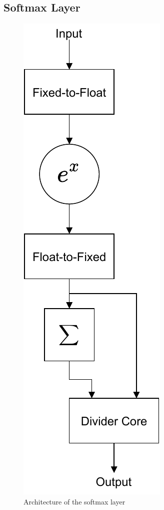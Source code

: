 \subsection{Softmax Layer}
\begin{figure}
	\centering 
	\includegraphics{figures/softmax}
	\caption{Architecture of the softmax layer}\label{softmax-arch}
\end{figure}

